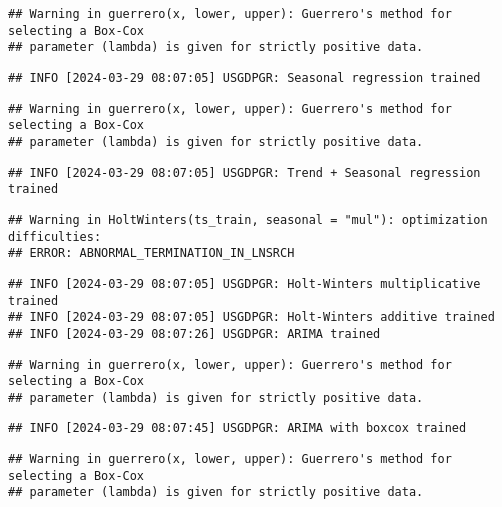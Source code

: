 \documentclass[
]{article}
\begin{document}
\begin{verbatim}
## Warning in guerrero(x, lower, upper): Guerrero's method for selecting a Box-Cox
## parameter (lambda) is given for strictly positive data.
\end{verbatim}

\begin{verbatim}
## INFO [2024-03-29 08:07:05] USGDPGR: Seasonal regression trained
\end{verbatim}

\begin{verbatim}
## Warning in guerrero(x, lower, upper): Guerrero's method for selecting a Box-Cox
## parameter (lambda) is given for strictly positive data.
\end{verbatim}

\begin{verbatim}
## INFO [2024-03-29 08:07:05] USGDPGR: Trend + Seasonal regression trained
\end{verbatim}

\begin{verbatim}
## Warning in HoltWinters(ts_train, seasonal = "mul"): optimization difficulties:
## ERROR: ABNORMAL_TERMINATION_IN_LNSRCH
\end{verbatim}

\begin{verbatim}
## INFO [2024-03-29 08:07:05] USGDPGR: Holt-Winters multiplicative trained
## INFO [2024-03-29 08:07:05] USGDPGR: Holt-Winters additive trained
## INFO [2024-03-29 08:07:26] USGDPGR: ARIMA trained
\end{verbatim}

\begin{verbatim}
## Warning in guerrero(x, lower, upper): Guerrero's method for selecting a Box-Cox
## parameter (lambda) is given for strictly positive data.
\end{verbatim}

\begin{verbatim}
## INFO [2024-03-29 08:07:45] USGDPGR: ARIMA with boxcox trained
\end{verbatim}

\begin{verbatim}
## Warning in guerrero(x, lower, upper): Guerrero's method for selecting a Box-Cox
## parameter (lambda) is given for strictly positive data.
\end{verbatim}
\end{document}

